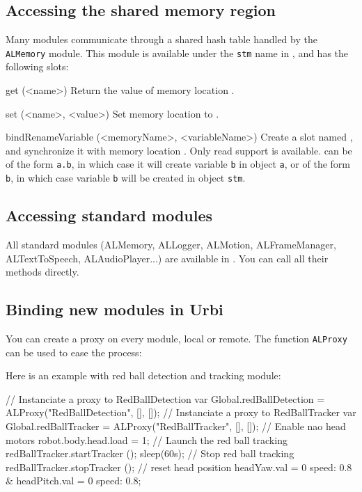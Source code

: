 \subsection{Accessing the \naoqi shared memory region}
Many \naoqi modules communicate through a shared hash table handled by
the \lstinline|ALMemory| module. This module is available under the
\lstinline|stm| name in \urbi, and has the following slots:

\begin{urbiscriptapi}
\item[get](<name>)
  Return the value of memory location .
\item[set](<name>, <value>)
  Set memory location  to .
\item[bindRenameVariable](<memoryName>, <variableName>) Create a \us slot
  named , and synchronize it with memory location
  . Only read support is available.   can
  be of the form \lstinline{a.b}, in which case it will create variable
  \lstinline{b} in object \lstinline{a}, or of the form \lstinline{b}, in
  which case variable \lstinline{b} will be created in object
  \lstinline{stm}.
\end{urbiscriptapi}

\subsection{Accessing standard \naoqi modules}

All standard \naoqi modules (ALMemory, ALLogger, ALMotion, ALFrameManager,
ALTextToSpeech, ALAudioPlayer...) are available in \urbi. You can call all
their methods directly.

\subsection{Binding new \naoqi modules in Urbi}

You can create a proxy on every \naoqi module, local or remote. The function
\lstinline|ALProxy| can be used to ease the process:

Here is an example with red ball detection and tracking module:
\begin{urbiunchecked}
// Instanciate a proxy to RedBallDetection
var Global.redBallDetection = ALProxy("RedBallDetection", [], []);
// Instanciate a proxy to RedBallTracker
var Global.redBallTracker = ALProxy("RedBallTracker", [], []);
// Enable nao head motors
robot.body.head.load = 1;
// Launch the red ball tracking
redBallTracker.startTracker ();
sleep(60s);
// Stop red ball tracking
redBallTracker.stopTracker ();
// reset head position
headYaw.val = 0 speed: 0.8 & headPitch.val = 0 speed: 0.8;
\end{urbiunchecked}

